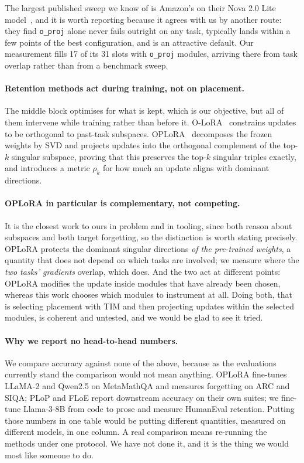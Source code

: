 \documentclass[11pt]{article}
\begin{document}
The largest published sweep we know of is Amazon's on their Nova 2.0 Lite
model~\cite{amazon2026}, and it is worth reporting because it agrees with us by
another route: they find \texttt{o\_proj} alone never fails outright on any
task, typically lands within a few points of the best configuration, and is an
attractive default. Our measurement fills 17 of its 31 slots with
\texttt{o\_proj} modules, arriving there from task overlap rather than from a
benchmark sweep.

\paragraph{Retention methods act during training, not on placement.} The middle
block optimises for what is kept, which is our objective, but all of them
intervene while training rather than before it. O-LoRA~\cite{wang2023}
constrains updates to be orthogonal to past-task subspaces.
OPLoRA~\cite{oplora2025} decomposes the frozen weights by SVD and projects
updates into the orthogonal complement of the top-$k$ singular subspace, proving
that this preserves the top-$k$ singular triples exactly, and introduces a
metric $\rho_k$ for how much an update aligns with dominant directions.

\paragraph{OPLoRA in particular is complementary, not competing.} It is the
closest work to ours in problem and in tooling, since both reason about
subspaces and both target forgetting, so the distinction is worth stating
precisely. OPLoRA
protects the dominant singular directions \emph{of the pre-trained weights}, a
quantity that does not depend on which tasks are involved; we measure where the
\emph{two tasks' gradients} overlap, which does. And the two act at different
points: OPLoRA modifies the update inside modules that have already been chosen,
whereas this work chooses which modules to instrument at all. Doing both, that
is selecting placement with TIM and then projecting updates within the selected
modules,
is coherent and untested, and we would be glad to see it tried.

\paragraph{Why we report no head-to-head numbers.} We compare accuracy against
none of the above, because as the evaluations currently stand the comparison
would not mean anything. OPLoRA fine-tunes LLaMA-2 and Qwen2.5 on MetaMathQA and
measures forgetting on ARC and SIQA; PLoP and FLoE report downstream accuracy on
their own suites; we fine-tune Llama-3-8B from code to prose and measure
HumanEval retention. Putting those numbers in one table would be putting
different quantities, measured on different models, in one column. A real
comparison means re-running the methods under one protocol. We have not done it,
and it is the thing we would most like someone to do.
\end{document}

